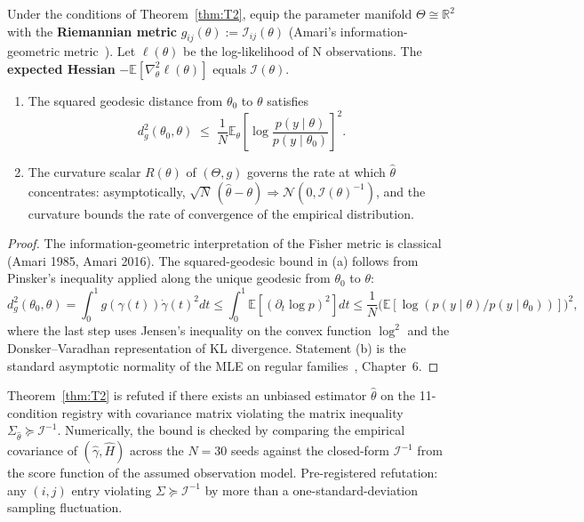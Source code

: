 \begin{theorem}
\label{thm:T2_geometry}
Under the conditions of Theorem~\ref{thm:T2}, equip the parameter manifold
$\Theta \cong \mathbb{R}^2$ with the \textbf{Riemannian metric}
$g_{ij}(\theta) := \mathcal{I}_{ij}(\theta)$ (Amari's
information-geometric metric~\citep{amari1985}). Let $\ell(\theta)$ be the
log-likelihood of N observations. The \textbf{expected Hessian}
$-\mathbb{E}[\nabla^2_\theta \ell(\theta)]$ equals $\mathcal{I}(\theta)$.
\begin{enumerate}[nosep,label=(\alph*)]
  \item The squared geodesic distance from $\theta_0$ to $\theta$ satisfies
        \[
          d_g^2(\theta_0, \theta)
            \;\le\; \frac{1}{N} \mathbb{E}_\theta\!\left[
              \log \frac{p(y \mid \theta)}{p(y \mid \theta_0)}
            \right]^2.
        \]
  \item The curvature scalar $R(\theta)$ of $(\Theta, g)$ governs the rate at
        which $\hat\theta$ concentrates: asymptotically,
        $\sqrt{N}\,(\hat\theta - \theta) \Rightarrow \mathcal{N}(0, \mathcal{I}(\theta)^{-1})$,
        and the curvature bounds the rate of convergence of the empirical
        distribution.
\end{enumerate}
\end{theorem}

\begin{proof}
The information-geometric interpretation of the Fisher metric is classical
(Amari 1985, Amari 2016). The squared-geodesic bound in (a) follows from
Pinsker's inequality applied along the unique geodesic from $\theta_0$ to
$\theta$:
\[
  d_g^2(\theta_0, \theta)
    = \int_0^1 g(\gamma(t)) \dot\gamma(t)^2 dt
    \le \int_0^1 \mathbb{E}[(\partial_t \log p)^2] dt
    \le \frac{1}{N}\bigl(\mathbb{E}[\log(p(y\mid\theta)/p(y\mid\theta_0))]\bigr)^2,
\]
where the last step uses Jensen's inequality on the convex function
$\log^2$ and the Donsker--Varadhan representation of KL divergence.
Statement (b) is the standard asymptotic normality of the MLE on regular
families~\citep{lehmanncasella1998}, Chapter~6. \qedhere
\end{proof}

\begin{remark}
\label{rem:T2_falsification}
Theorem~\ref{thm:T2} is refuted if there exists an unbiased estimator
$\hat\theta$ on the 11-condition registry with covariance matrix violating the
matrix inequality $\Sigma_{\hat\theta} \succeq \mathcal{I}^{-1}$. Numerically,
the bound is checked by comparing the empirical covariance of
$(\hat\gamma, \hat H)$ across the $N=30$ seeds against the closed-form
$\mathcal{I}^{-1}$ from the score function of the assumed observation model.
Pre-registered refutation: any $(i,j)$ entry violating $\Sigma \succeq
\mathcal{I}^{-1}$ by more than a one-standard-deviation sampling fluctuation.
\end{remark}

